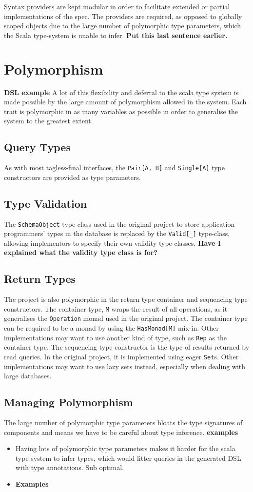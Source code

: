 \documentclass{report}
\newcommand \2[0]{\textbf{2}}
\newcommand \3[0]{\textbf{3}}
\newcommand{\todo}[1]{\textbf{#1}}
\begin{document}
Syntax providers are kept modular in order to facilitate extended or partial implementations of the spec. The providers are required, as opposed to globally scoped objects due to the large number of polymorphic type parameters, which the Scala type-system is unable to infer. \todo{Put this last sentence earlier.}


\section{Polymorphism}
\todo{DSL example}
A lot of this flexibility and deferral to the scala type system is made possible by the large amount of polymorphism allowed in the system. Each trait is polymorphic in as many variables as possible in order to generalise the system to the greatest extent.

\subsection{Query Types}
As with most tagless-final interfaces, the \texttt{Pair[A, B]} and \texttt{Single[A]} type constructors are provided as type parameters.
\subsection{Type Validation}
The \texttt{SchemaObject} type-class used in the original project to store application-programmers' types in the database is replaced by the \texttt{Valid[_]} type-class, allowing implementors to specify their own validity type-classes.
\todo{Have I explained what the validity type class is for?}
\subsection{Return Types}
The project is also polymorphic in the return type container and sequencing type constructors. The container type, \texttt{M} wraps the result of all operations, as it generalises the \texttt{Operation} monad used in the original project. The container type can be required to be a monad by using the \texttt{HasMonad[M]} mix-in. Other implementations may want to use another kind of type, such as \texttt{Rep} as the container type. The sequencing type constructor is the type of results returned by read queries. In the original project, it is implemented using eager \texttt{Set}s. Other implementations may want to use lazy sets instead, especially when dealing with large databases.

\subsection{Managing Polymorphism}
The large number of polymorphic type parameters bloats the type signatures of components and means we have to be careful about type inference. \todo{examples}
\begin{itemize}
    \item Having lots of polymorphic type parameters makes it harder for the scala type system to infer types, which would litter queries in the generated DSL with type annotations. Sub optimal.
    \item\todo{Examples}
\end{itemize}
\end{document}
